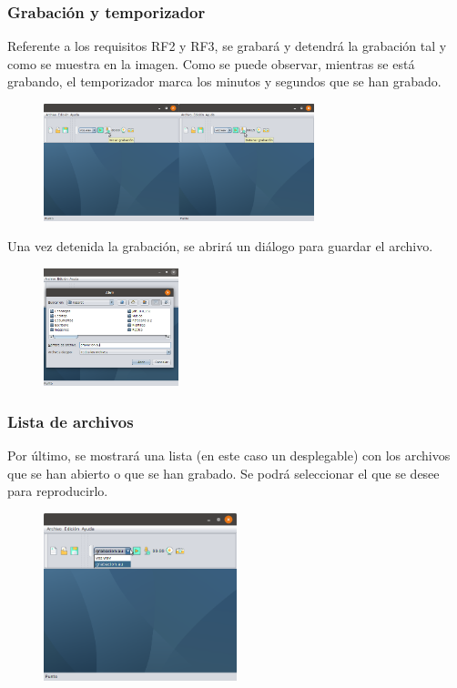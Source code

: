 \documentclass[11pt,a4paper]{article}
\begin{document}
\subsubsection{Grabación y temporizador}
Referente a los requisitos RF2 y RF3, se grabará y detendrá la grabación tal y como se muestra en la imagen. Como se puede observar, mientras se está grabando, el temporizador marca los minutos y segundos que se han grabado.

\begin{figure}[H]
\centering
	\includegraphics[width=0.7\textwidth]{img/grabacion.png}
\end{figure}

Una vez detenida la grabación, se abrirá un diálogo para guardar el archivo.

\begin{figure}[H]
\centering
	\includegraphics[width=0.35\textwidth]{img/guardar.png}
\end{figure}

\subsubsection{Lista de archivos}
Por último, se mostrará una lista (en este caso un desplegable) con los archivos que se han abierto o que se han grabado. Se podrá seleccionar el que se desee para reproducirlo.

\begin{figure}[H]
\centering
	\includegraphics[width=0.5\textwidth]{img/lista.png}
\end{figure}
\end{document}
